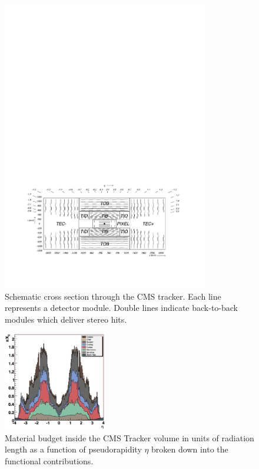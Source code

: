 \documentclass[a4paper]{jpconf}
\begin{document}
\begin{figure}[h!]
  \begin{center}
    \includegraphics[width=0.8\textwidth]{fig/general_layout.pdf}
    \caption{Schematic cross section through the CMS tracker. Each line represents a detector module. Double lines indicate back-to-back modules which deliver stereo hits.}
    \label{fig:tklayout}
  \end{center}
\end{figure}

\begin{figure}[h!]
  \begin{center}
    \includegraphics[width=0.4\textwidth]{fig/trackerMaterialbudget.png}
    \caption{Material budget inside the CMS Tracker volume in units of radiation length as a function of pseudorapidity $\eta$ broken down into the functional contributions.}
    \label{fig:tkmaterial}
  \end{center}
\end{figure}
\end{document}

